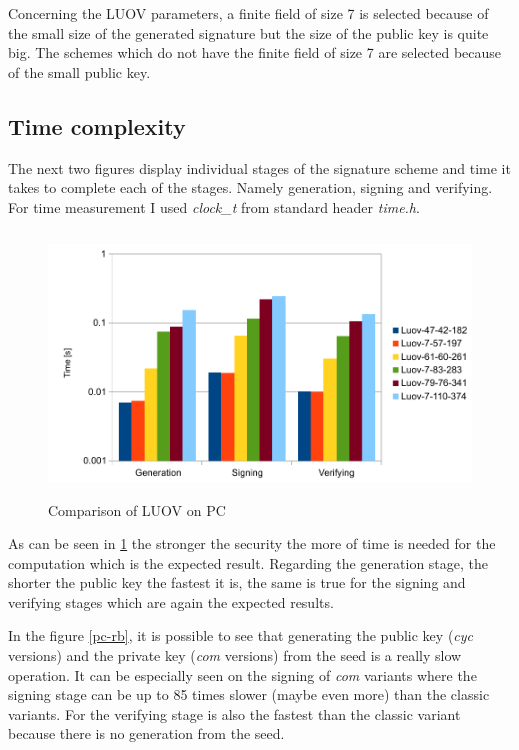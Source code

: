 \documentclass[thesis=M,english]{FITthesis}[2019/12/23]
\begin{document}
\bigskip
\noindent
Concerning the LUOV parameters, a finite field of size 7 is selected because of the small size of the generated signature but the size of the public key is quite big. The schemes which do not have the finite field of size 7 are selected because of the small public key.

\subsection{Time complexity} \label{time-complex-pc}
The next two figures display individual stages of the signature scheme and time it takes to complete each of the stages. Namely generation, signing and verifying. For time measurement I used \textit{clock\_t} from standard header \textit{time.h}.
\begin{figure}[H]
\centering
\includegraphics[width=13cm,height=7cm]{images/pc-luov.pdf}
\caption{Comparison of LUOV on PC}
\label{pc-luov}
\end{figure}

\noindent
As can be seen in \ref{pc-luov} the stronger the security the more of time is needed for the computation which is the expected result. Regarding the generation stage, the shorter the public key the fastest it is, the same is true for the signing and verifying stages which are again the expected results.

\bigskip
\noindent
In the figure \ref{pc-rb}, it is possible to see that generating the public key (\textit{cyc} versions) and the private key (\textit{com} versions) from the seed is a really slow operation. It can be especially seen on the signing of \textit{com} variants where the signing stage can be up to 85 times slower (maybe even more) than the classic variants. For the verifying stage is also the fastest than the classic variant because there is no generation from the seed.
\end{document}
